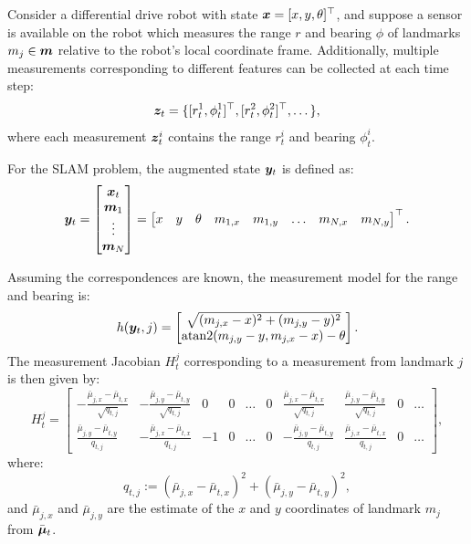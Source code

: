 \begin{example} \label{ex:rangeandbearingEKFSLAM}
\theoremstyle{definition}
Consider a differential drive robot with state $\bm{x} = [x, y, \theta]^\top $, and suppose a sensor is available on the robot which measures the range $r$ and bearing $\phi$ of landmarks $m_j \in \bm{m}$ relative to the robot’s local coordinate frame. Additionally, multiple measurements corresponding to different features can be collected at each time step:
\begin{equation*}
\bm{z}_t = \{[r_t^1,\phi_t^1]^\top , [r_t^2,\phi_t^2]^\top , \dots\},
\end{equation*}
where each measurement $\bm{z}_t^i$ contains the range $r_t^i$ and bearing $\phi_t^i$. 

For the SLAM problem, the augmented state $\bm{y}_t$ is defined as:
\begin{equation*}
\bm{y}_t =
    \begin{bmatrix}
    \bm{x}_t \\
    \bm{m}_1 \\ \vdots \\ \bm{m}_N
    \end{bmatrix}
    = \begin{bmatrix}
    x & y & \theta & m_{1,x} &m_{1,y} & \dots & m_{N,x} &m_{N,y}
    \end{bmatrix}^\top .
\end{equation*}

Assuming the correspondences are known, the measurement model for the range and bearing is:
\begin{equation}
h(\bm{y}_t, j)  = \begin{bmatrix}
\sqrt{(m_{j,x} - x)^{2} + (m_{j,y}- y)^{2}} \\
\text{atan2}(m_{j,y}- y, m_{j,x} - x) - \theta
\end{bmatrix}.
\end{equation}
The measurement Jacobian $H^j_t$ corresponding to a measurement from landmark $j$ is then given by:
\begin{equation}
H^j_t = \begin{bmatrix}
-\frac{\bar{\mu}_{j,x} - \bar{\mu}_{t,x}}{\sqrt{q_{t,j}}} & -\frac{\bar{\mu}_{j,y} - \bar{\mu}_{t,y}}{\sqrt{q_{t,j}}} & 0 & 0 & \dots & 0 & \frac{\bar{\mu}_{j,x} - \bar{\mu}_{t,x}}{\sqrt{q_{t,j}}} & \frac{\bar{\mu}_{j,y} - \bar{\mu}_{t,y}}{\sqrt{q_{t,j}}} & 0 & \dots \\
\frac{\bar{\mu}_{j,y} - \bar{\mu}_{t,y}}{q_{t,j}} & -\frac{\bar{\mu}_{j,x} - \bar{\mu}_{t,x}}{q_{t,j}} & -1 & 0 & \dots & 0 & -\frac{\bar{\mu}_{j,y} - \bar{\mu}_{t,y}}{q_{t,j}} & \frac{\bar{\mu}_{j,x} - \bar{\mu}_{t,x}}{q_{t,j}} & 0 & \dots 
\end{bmatrix},
\end{equation}
where:
\begin{equation*}
    q_{t,j} := (\bar{\mu}_{j,x} - \bar{\mu}_{t,x})^{2} + (\bar{\mu}_{j,y} - \bar{\mu}_{t,y})^{2},
\end{equation*}
and $\bar{\mu}_{j,x}$ and $\bar{\mu}_{j,y}$ are the estimate of the $x$ and $y$ coordinates of landmark $m_j$ from $\bar{\bm{\mu}}_t$.


\end{example}
